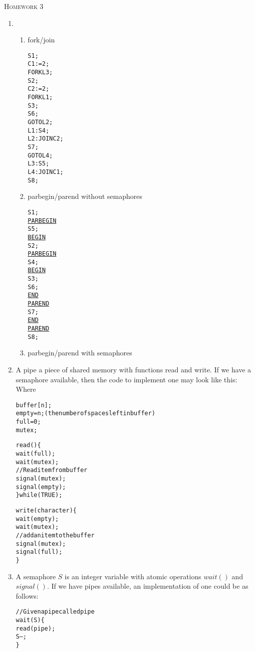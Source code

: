 \documentclass{article}
\begin{document}
\begin{center}
    \textsc{\Large Homework 3}\\
\end{center}


\begin{enumerate}
\item
  \begin{enumerate}    
  \item fork/join
\begin{alltt}
    S1;
    C1 := 2;
    FORK L3;
    S2;
    C2 := 2;
    FORK L1;
    S3;
    S6;
    GOTO L2;
L1: S4;
L2: JOIN C2;
    S7;
    GOTO L4;
L3: S5;
L4: JOIN C1;
    S8;
\end{alltt}
    \item parbegin/parend without semaphores
\begin{alltt}
S1;
\underline{PARBEGIN}
  S5;
  \underline{BEGIN}
    S2;
    \underline{PARBEGIN}
      S4;
      \underline{BEGIN}
        S3;
        S6;
      \underline{END}
    \underline{PAREND}
    S7;
  \underline{END}
\underline{PAREND}
S8;
\end{alltt}
    \item parbegin/parend with semaphores
  \end{enumerate}
\item A pipe a piece of shared memory with functions read and write. If we have a semaphore available, then the code to implement one may look like this:\\
Where
\begin{alltt}
  buffer[n];
  empty = n; (the number of spaces left in buffer)
  full = 0;
  mutex;
\end{alltt}

\begin{alltt}
  read() \{
    wait(full);
    wait(mutex);
    // Read item from buffer
    signal(mutex);
    signal(empty);
  \} while (TRUE);
\end{alltt}

\begin{alltt}
  write(character) \{
    wait(empty);
    wait(mutex);
    // add an item to the buffer
    signal(mutex);
    signal(full);
  \}
\end{alltt}

\item A semaphore $S$ is an integer variable with atomic operations $wait()$ and $signal()$. If we have pipes available, an implementation of one could be as follows:
  \begin{alltt}
    // Given a pipe called pipe
    wait(S) \{
      read(pipe);
      S--;
    \}
  \end{alltt}
  

\end{enumerate}
\end{document}
